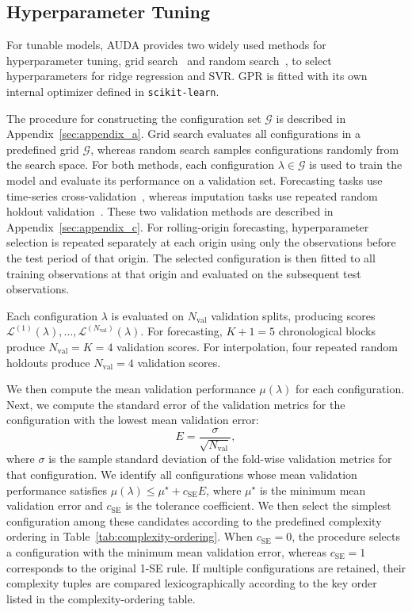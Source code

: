 \subsection{Hyperparameter Tuning}

For tunable models, AUDA provides two widely used methods for hyperparameter tuning, grid search~\cite{hastie2009elements} and random search~\cite{bergstra2012random}, to select hyperparameters for ridge regression and SVR. GPR is fitted with its own internal optimizer defined in \texttt{scikit-learn}.

The procedure for constructing the configuration set \(\mathcal{G}\) is described in Appendix~\ref{sec:appendix_a}.
Grid search evaluates all configurations in a predefined grid \(\mathcal{G}\), whereas random search samples configurations randomly from the search space.
For both methods, each configuration \(\lambda \in \mathcal{G}\) is used to train the model and evaluate its performance on a validation set.
Forecasting tasks use time-series cross-validation~\cite{hyndman2018forecasting}, whereas imputation tasks use repeated random holdout validation~\cite{kohavi1995study}.
These two validation methods are described in Appendix~\ref{sec:appendix_c}.
For rolling-origin forecasting, hyperparameter selection is repeated separately at each origin using only the observations before the test period of that origin.
The selected configuration is then fitted to all training observations at that origin and evaluated on the subsequent test observations.

Each configuration \(\lambda\) is evaluated on \(N_{\mathrm{val}}\) validation splits, producing scores \(\mathcal{L}^{(1)}(\lambda), \ldots, \mathcal{L}^{(N_{\mathrm{val}})}(\lambda)\).
For forecasting, \(K+1=5\) chronological blocks produce \(N_{\mathrm{val}}=K=4\) validation scores.
For interpolation, four repeated random holdouts produce \(N_{\mathrm{val}}=4\) validation scores.

We then compute the mean validation performance \(\mu(\lambda)\) for each configuration.
Next, we compute the standard error of the validation metrics for the configuration with the lowest mean validation error:
\[
	E = \frac{\sigma}{\sqrt{N_{\mathrm{val}}}},
\]
where \(\sigma\) is the sample standard deviation of the fold-wise validation metrics for that configuration.
We identify all configurations whose mean validation performance satisfies \(\mu(\lambda) \leq \mu^\star + c_{\mathrm{SE}} E\), where \(\mu^\star\) is the minimum mean validation error and \(c_{\mathrm{SE}}\) is the tolerance coefficient.
We then select the simplest configuration among these candidates according to the predefined complexity ordering in Table~\ref{tab:complexity-ordering}.
When \(c_{\mathrm{SE}} = 0\), the procedure selects a configuration with the minimum mean validation error, whereas \(c_{\mathrm{SE}} = 1\) corresponds to the original 1-SE rule.
If multiple configurations are retained, their complexity tuples are compared lexicographically according to the key order listed in the complexity-ordering table.

